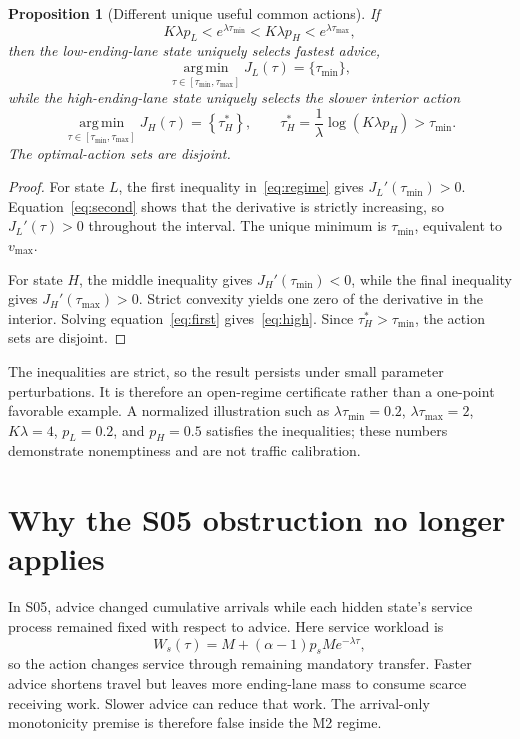 \documentclass[11pt]{article}
\newtheorem{proposition}{Proposition}
\newcommand{\argminset}{\operatorname*{arg\,min}}
\begin{document}
\begin{proposition}[Different unique useful common actions]
If
\begin{equation}
 K\lambda p_L<e^{\lambda\tau_{\min}}
 <K\lambda p_H<e^{\lambda\tau_{\max}},
 \label{eq:regime}
\end{equation}
then the low-ending-lane state uniquely selects fastest advice,
\begin{equation}
 \argminset_{\tau\in[\tau_{\min},\tau_{\max}]}J_L(\tau)
 =\{\tau_{\min}\},
 \label{eq:low}
\end{equation}
while the high-ending-lane state uniquely selects the slower interior action
\begin{equation}
 \argminset_{\tau\in[\tau_{\min},\tau_{\max}]}J_H(\tau)
 =\left\{\tau_H^*\right\},\qquad
 \tau_H^*=\frac{1}{\lambda}\log(K\lambda p_H)>
 \tau_{\min}.
 \label{eq:high}
\end{equation}
The optimal-action sets are disjoint.
\end{proposition}

\begin{proof}
For state \(L\), the first inequality in~\eqref{eq:regime} gives
\(J_L'(\tau_{\min})>0\). Equation~\eqref{eq:second} shows that the derivative is
strictly increasing, so \(J_L'(\tau)>0\) throughout the interval. The unique
minimum is \(\tau_{\min}\), equivalent to \(v_{\max}\).

For state \(H\), the middle inequality gives
\(J_H'(\tau_{\min})<0\), while the final inequality gives
\(J_H'(\tau_{\max})>0\). Strict convexity yields one zero of the derivative in
the interior. Solving equation~\eqref{eq:first} gives~\eqref{eq:high}. Since
\(\tau_H^*>\tau_{\min}\), the action sets are disjoint.
\end{proof}

The inequalities are strict, so the result persists under small parameter
perturbations. It is therefore an open-regime certificate rather than a
one-point favorable example. A normalized illustration such as
\(\lambda\tau_{\min}=0.2\), \(\lambda\tau_{\max}=2\),
\(K\lambda=4\), \(p_L=0.2\), and \(p_H=0.5\) satisfies the inequalities; these
numbers demonstrate nonemptiness and are not traffic calibration.

\section{Why the S05 obstruction no longer applies}

In S05, advice changed cumulative arrivals while each hidden state's service
process remained fixed with respect to advice. Here service workload is
\[
 W_s(\tau)=M+(\alpha-1)p_sM e^{-\lambda\tau},
\]
so the action changes service through remaining mandatory transfer. Faster
advice shortens travel but leaves more ending-lane mass to consume scarce
receiving work. Slower advice can reduce that work. The arrival-only monotonicity
premise is therefore false inside the M2 regime.
\end{document}
